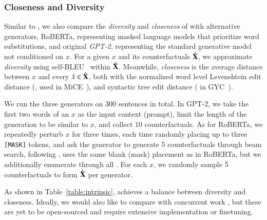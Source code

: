 \subsubsection{Closeness and Diversity}
Similar to \citet{madaan2020generate}, we also compare the \emph{diversity} and \emph{closeness} of \sysname with alternative generators, \ie RoBERTa, representing masked language models that prioritize word substitutions, and original \emph{GPT-2}, representing the standard generative model not conditioned on $x$. 
For a given $x$ and its counterfactuals $\hat{\mathbf{X}}$, we approximate \emph{diversity} using self-BLEU~\cite{zhu2018texygen} within $\hat{\mathbf{X}}$.
Meanwhile, \emph{closeness} is the average distance between $x$ and every $\hat{x} \in \hat{\mathbf{X}}$, both with the normalized word level Levenshtein edit distance (\cite{levenshtein1966binary}, used in MiCE~\cite{ross2020explaining}), and syntactic tree edit distance (\cite{zhang1989simple} in GYC~\cite{madaan2020generate}).

We run the three generators on 300 sentences in total.
In GPT-2, we take the first two words of an $x$ as the input context (prompt), limit the length of the generation to be similar to $x$, and collect 10 counterfactuals.
As for RoBERTa, we repeatedly perturb $x$ for three times, each time randomly placing up to three \texttt{[MASK]} tokens, and ask the generator to generate 5 counterfactuals through beam search, following \citet{checklist:acl20}.
\sysname uses the same blank (mask) placement as in RoBERTa, but we additionally enumerate through all \tagstrs.
For each $x$, we randomly sample 5 counterfactuals to form $\hat{\mathbf{X}}$ per generator.

As shown in Table~\ref{table:intrinsic}, \sysname achieves a balance between diversity and closeness.
Ideally, we would also like to compare \sysname with concurrent work \cite{madaan2020generate, ross2020explaining}, but these are yet to be open-sourced and require extensive implementation or finetuning.



